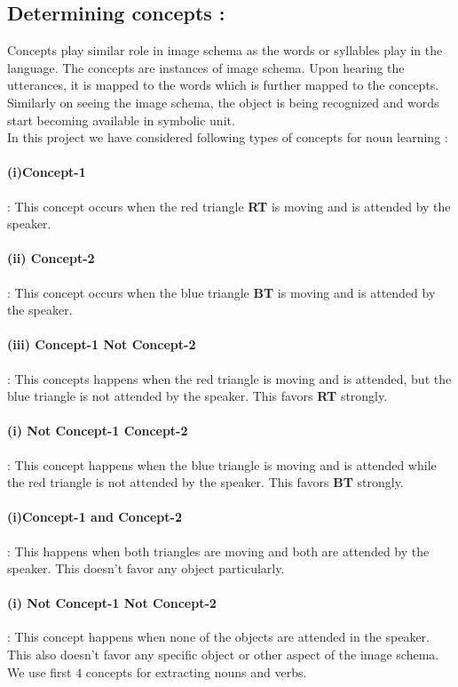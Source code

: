 \def\DevnagVersion{2.15}\documentclass[a4paper, 11pt, notitlepage]{report}
\begin{document}
\subsection{Determining concepts :}

Concepts play similar role in image schema as the words or syllables play  in the language. The concepts are instances of image schema. Upon hearing the utterances, it is mapped to the words which is further mapped to the concepts. Similarly on seeing the image schema, the object is being recognized and words start becoming available in symbolic unit.\\ 
\hspace*{15pt} In this project we have considered following types of concepts for noun learning :\\
\hspace*{20pt} \paragraph{(i)Concept-1} : This concept occurs when the red triangle {\bf RT} is moving and  is attended by the speaker.
\hspace*{20pt} \paragraph{(ii) Concept-2} : This concept occurs when the blue triangle {\bf BT} is moving and is attended by the speaker. 
\hspace*{20pt} \paragraph{(iii) Concept-1 Not Concept-2} : This concepts happens when the red triangle is moving and is attended, but the blue triangle is not attended by the speaker. This favors {\bf RT} strongly.
\hspace*{20pt} \paragraph{(i) Not Concept-1 Concept-2} : This concept happens when the blue triangle is moving and is attended while the red triangle is not attended by the speaker. This favors {\bf BT} strongly.
\hspace*{20pt} \paragraph{(i)Concept-1 and Concept-2} : This happens when both triangles are moving and both are attended by the speaker. This doesn't favor any object particularly.
\hspace*{20pt} \paragraph{(i) Not Concept-1 Not Concept-2} : This concept happens when none of the objects are attended in the speaker. This also doesn't favor any specific object or other aspect of the image schema.
\hspace*{15pt} We use first $4$ concepts for extracting nouns and verbs.
\end{document}
